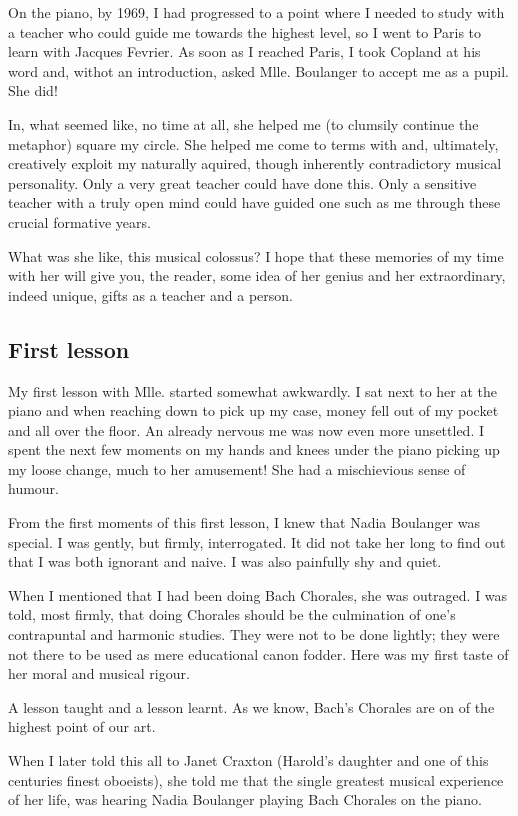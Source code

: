 \documentclass{article}
\begin{document}
On the piano, by 1969, I had progressed to a point where I needed to study with a teacher who could guide me towards the highest level, so I went to Paris to learn with Jacques Fevrier.
As soon as I reached Paris, I took Copland at his word and, withot an introduction, asked Mlle.
Boulanger to accept me as a pupil.
She did!

In, what seemed like, no time at all, she helped me (to clumsily continue the metaphor) square my circle.
She helped me come to terms with and, ultimately, creatively exploit my naturally aquired, though inherently contradictory musical personality.
Only a very great teacher could have done this.
Only a sensitive teacher with a truly open mind could have guided one such as me through these crucial formative years.

What was she like, this musical colossus? I hope that these memories of my time with her will give you, the reader, some idea of her genius and her extraordinary, indeed unique, gifts as a teacher and a person.

\subsection{First lesson}

My first lesson with Mlle. started somewhat awkwardly.
I sat next to her at the piano and when reaching down to pick up my case, money fell out of my pocket and all over the floor.
An already nervous me was now even more unsettled.
I spent the next few moments on my hands and knees under the piano picking up my loose change, much to her amusement! She had a mischievious sense of humour.

From the first moments of this first lesson, I knew that Nadia Boulanger was special.
I was gently, but firmly, interrogated.
It did not take her long to find out that I was both ignorant and naive.
I was also painfully shy and quiet.

When I mentioned that I had been doing Bach Chorales, she was outraged.
I was told, most firmly, that doing Chorales should be the culmination of one's contrapuntal and harmonic studies.
They were not to be done lightly; they were not there to be used as mere educational canon fodder.
Here was my first taste of her moral and musical rigour.

A lesson taught and  a lesson learnt.
As we know, Bach's Chorales are on of the highest point of our art.

When I later told this all to Janet Craxton (Harold's daughter and one of this centuries finest oboeists), she told me that the single greatest musical experience of her life, was hearing Nadia Boulanger playing Bach Chorales on the piano.
\end{document}

